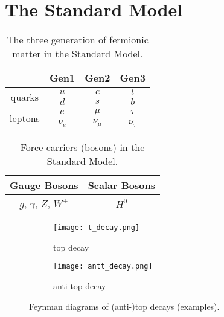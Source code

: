 
\section{The Standard Model}


\begin{table}[htbp]
    \centering
    \begin{tabular}{||c|c|c|c||}
    \hline
    & Gen1 & Gen2 & Gen3 \\
    \hline
    \multirow{2}{1.2cm}{quarks} & $u$ & $c$ & $t$ \\
     & $d$ & $s$ & $b$ \\
    \hline
    \multirow{2}{1.2cm}{leptons} & $e$ & $\mu$ & $\tau$ \\
     & $\nu_e$ & $\nu_\mu$ & $\nu_\tau$ \\
    \hline
    \end{tabular}
    \caption{The three generation of fermionic matter in the Standard Model.}
    \label{tab:SMFerm}
\end{table}



\begin{table}[htbp]
    \centering
    \begin{tabular}{||c|c||}
    \hline
       Gauge Bosons  & Scalar Bosons \\
     \hline
       $g$, $\gamma$, $Z$, $W^\pm$ & $H^0$ \\
     \hline
    \end{tabular}
    \caption{Force carriers (bosons) in the Standard Model.}
    \label{tab:SMBos}
\end{table}




\begin{figure}[htbp]
    \centering
    \begin{subfigure}{0.45\linewidth}
        \texttt{[image: t\_decay.png]}
        \caption{top decay}
        \label{fig:top}
    \end{subfigure}
    \begin{subfigure}{0.45\linewidth}
        \texttt{[image: antt\_decay.png]}
        \caption{anti-top decay}
        \label{fig:anttop}
    \end{subfigure}
    \caption{Feynman diagrams of (anti-)top decays (examples).}
    \label{fig:decayDiag}
\end{figure}

